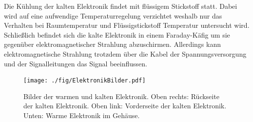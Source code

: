 Die Kühlung der kalten Elektronik findet mit flüssigem Stickstoff statt.
Dabei wird auf eine aufwendige Temperaturregelung verzichtet weshalb nur das Verhalten bei Raumtemperatur und Flüssigstickstoff Temperatur untersucht wird.
Schließlich befindet sich die kalte Elektronik in einem Faraday-Käfig um sie gegenüber elektromagnetischer Strahlung abzuschirmen.
Allerdings kann elektromagnetische Strahlung trotzdem über die Kabel der Spannungsversorgung und der Signalleitungen das Signal beeinflussen.
\begin{figure}[!t]
\begin{center}
\texttt{[image: ./fig/ElektronikBilder.pdf]}
\vspace{-0.5cm}
\caption{Bilder der warmen und kalten Elektronik.
Oben rechts: Rückseite der kalten Elektronik. Oben link: Vorderseite der kalten Elektronik.
Unten: Warme Elektronik im Gehäuse.}
\label{fig:ElektronikBilder}
\end{center}
\end{figure}
